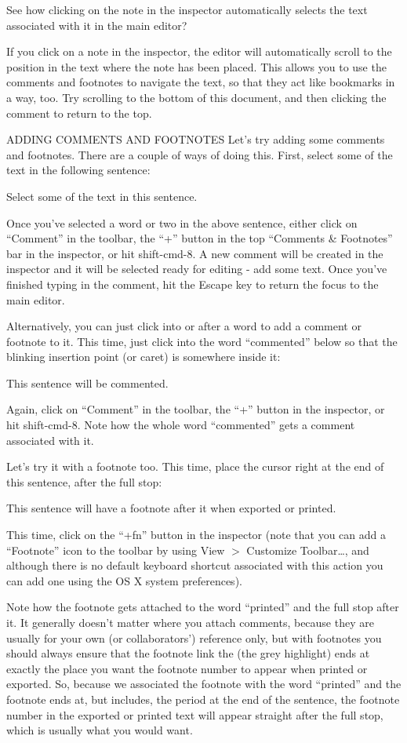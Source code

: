 \documentclass[10pt,oneside]{memoir}
\begin{document}
See how clicking on the note in the inspector automatically selects the text associated with it in the main editor?


If you click on a note in the inspector, the editor will automatically scroll to the position in the text where the note has been placed. This allows you to use the comments and footnotes to navigate the text, so that they act like bookmarks in a way, too. Try scrolling to the bottom of this document, and then clicking the comment to return to the top.


ADDING COMMENTS AND FOOTNOTES
Let's try adding some comments and footnotes. There are a couple of ways of doing this. First, select some of the text in the following sentence:


Select some of the text in this sentence.


Once you've selected a word or two in the above sentence, either click on ``Comment'' in the toolbar, the ``+'' button in the top ``Comments \& Footnotes'' bar in the inspector, or hit shift-cmd-8. A new comment will be created in the inspector and it will be selected ready for editing - add some text. Once you've finished typing in the comment, hit the Escape key to return the focus to the main editor.


Alternatively, you can just click into or after a word to add a comment or footnote to it. This time, just click into the word ``commented'' below so that the blinking insertion point (or caret) is somewhere inside it:


This sentence will be commented.


Again, click on ``Comment'' in the toolbar, the ``+'' button in the inspector, or hit shift-cmd-8. Note how the whole word ``commented'' gets a comment associated with it.


Let's try it with a footnote too. This time, place the cursor right at the end of this sentence, after the full stop:


This sentence will have a footnote after it when exported or printed.


This time, click on the ``+fn'' button in the inspector (note that you can add a ``Footnote'' icon to the toolbar by using View $>$ Customize Toolbar{\ldots}, and although there is no default keyboard shortcut associated with this action you can add one using the OS X system preferences).


Note how the footnote gets attached to the word ``printed'' and the full stop after it. It generally doesn't matter where you attach comments, because they are usually for your own (or collaborators') reference only, but with footnotes you should always ensure that the footnote link the (the grey highlight) ends at exactly the place you want the footnote number to appear when printed or exported. So, because we associated the footnote with the word ``printed'' and the footnote ends at, but includes, the period at the end of the sentence, the footnote number in the exported or printed text will appear straight after the full stop, which is usually what you would want.
\end{document}
